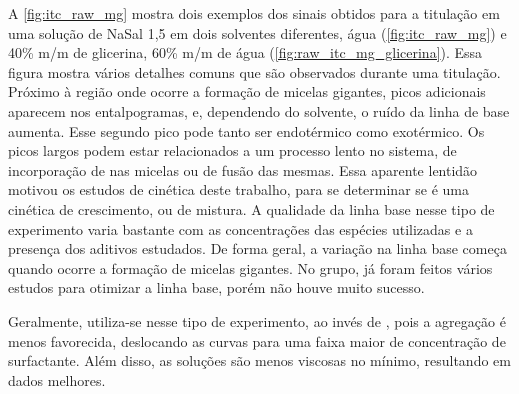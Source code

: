 		
		A \autoref{fig:itc_raw_mg} mostra dois exemplos dos sinais obtidos para a titulação \TTAB{} em uma solução de NaSal 1,5 \mM{} em dois solventes diferentes, água (\autoref{fig:itc_raw_mg}) e 40\% m/m de glicerina, 60\% m/m de água (\autoref{fig:raw_itc_mg_glicerina}). Essa figura mostra vários detalhes comuns que são observados durante uma titulação. Próximo à região onde ocorre a formação de micelas gigantes, picos adicionais aparecem nos entalpogramas, e, dependendo do solvente, o ruído da linha de base aumenta. Esse segundo pico pode tanto ser endotérmico como exotérmico. Os picos largos podem estar relacionados a um processo lento no sistema, de incorporação de \Sal{} nas micelas ou de fusão das mesmas.\cite{Ito2016} Essa aparente lentidão motivou os estudos de cinética deste trabalho, para se determinar se é uma cinética de crescimento, ou de mistura. %
		A qualidade da linha base nesse tipo de experimento varia bastante com as concentrações das espécies utilizadas e a presença dos aditivos estudados. De forma geral, a variação na linha base começa quando ocorre a formação de micelas gigantes. No grupo, já foram feitos vários estudos para otimizar a linha base, porém não houve muito sucesso.
		
		Geralmente, utiliza-se \TTAB{} nesse tipo de experimento, ao invés de \CTAB{}, pois a agregação é menos favorecida, deslocando as curvas para uma faixa maior de concentração de surfactante. Além disso, as soluções são menos viscosas no mínimo, resultando em dados melhores. 
		
